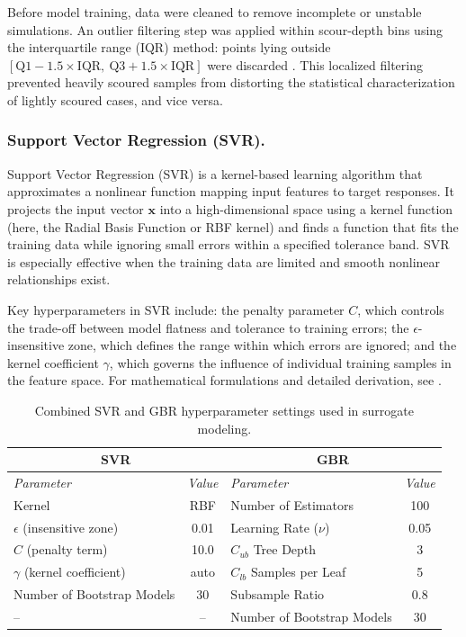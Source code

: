 \documentclass[authoryear,preprint,review,12pt]{elsarticle}
\begin{document}
Before model training, data were cleaned to remove incomplete or unstable simulations. An outlier filtering step was applied within scour-depth bins using the interquartile range (IQR) method: points lying outside $[\text{Q1} - 1.5 \times \text{IQR},\ \text{Q3} + 1.5 \times \text{IQR}]$ were discarded \citep{tukey1977exploratory}. This localized filtering prevented heavily scoured samples from distorting the statistical characterization of lightly scoured cases, and vice versa.



\subsubsection{Support Vector Regression (SVR).} 
Support Vector Regression (SVR) is a kernel-based learning algorithm that approximates a nonlinear function mapping input features to target responses. It projects the input vector $\bm{x}$ into a high-dimensional space using a kernel function (here, the Radial Basis Function or RBF kernel) and finds a function that fits the training data while ignoring small errors within a specified tolerance band. SVR is especially effective when the training data are limited and smooth nonlinear relationships exist.

Key hyperparameters in SVR include: the penalty parameter $C$, which controls the trade-off between model flatness and tolerance to training errors; the $\epsilon$-insensitive zone, which defines the range within which errors are ignored; and the kernel coefficient $\gamma$, which governs the influence of individual training samples in the feature space. For mathematical formulations and detailed derivation, see \citep{Smola2004SVR}.

\begin{table}[htbp]
\centering
\caption{Combined SVR and GBR hyperparameter settings used in surrogate modeling.}
\label{tab:surrogate_hyperparams}
\begin{tabular}{|l|c|l|c|}
\hline
\multicolumn{2}{|c|}{\textbf{SVR}} & \multicolumn{2}{c|}{\textbf{GBR}} \\
\hline
\textit{Parameter} & \textit{Value} & \textit{Parameter} & \textit{Value} \\
\hline
Kernel & RBF & Number of Estimators & 100 \\
$\epsilon$ (insensitive zone) & 0.01 & Learning Rate ($\nu$) & 0.05 \\
$C$ (penalty term) & 10.0 & $C_{ub}$ Tree Depth & 3 \\
$\gamma$ (kernel coefficient) & auto & $C_{lb}$ Samples per Leaf & 5 \\
Number of Bootstrap Models & 30 & Subsample Ratio & 0.8 \\
-- & -- & Number of Bootstrap Models & 30 \\
\hline
\end{tabular}
\end{table}
\end{document}
